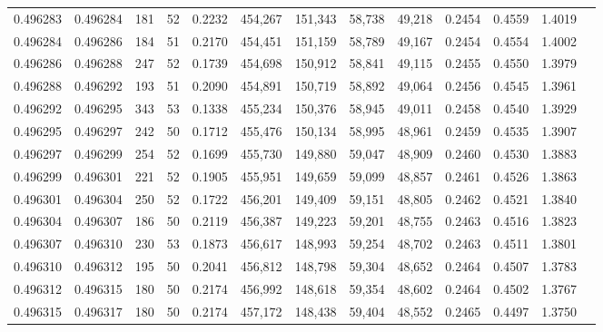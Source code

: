 \begin{tabular}{rrrrrrrrrrrrr}
0.496283 & 0.496284 &   181 &  52 &                                     0.2232 & 454,267 & 151,343 &  58,738 &  49,218 & 0.2454 & 0.4559 & 1.4019 \\
0.496284 & 0.496286 &   184 &  51 &                                     0.2170 & 454,451 & 151,159 &  58,789 &  49,167 & 0.2454 & 0.4554 & 1.4002 \\
0.496286 & 0.496288 &   247 &  52 &                                     0.1739 & 454,698 & 150,912 &  58,841 &  49,115 & 0.2455 & 0.4550 & 1.3979 \\
0.496288 & 0.496292 &   193 &  51 &                                     0.2090 & 454,891 & 150,719 &  58,892 &  49,064 & 0.2456 & 0.4545 & 1.3961 \\
0.496292 & 0.496295 &   343 &  53 &                                     0.1338 & 455,234 & 150,376 &  58,945 &  49,011 & 0.2458 & 0.4540 & 1.3929 \\
0.496295 & 0.496297 &   242 &  50 &                                     0.1712 & 455,476 & 150,134 &  58,995 &  48,961 & 0.2459 & 0.4535 & 1.3907 \\
0.496297 & 0.496299 &   254 &  52 &                                     0.1699 & 455,730 & 149,880 &  59,047 &  48,909 & 0.2460 & 0.4530 & 1.3883 \\
0.496299 & 0.496301 &   221 &  52 &                                     0.1905 & 455,951 & 149,659 &  59,099 &  48,857 & 0.2461 & 0.4526 & 1.3863 \\
0.496301 & 0.496304 &   250 &  52 &                                     0.1722 & 456,201 & 149,409 &  59,151 &  48,805 & 0.2462 & 0.4521 & 1.3840 \\
0.496304 & 0.496307 &   186 &  50 &                                     0.2119 & 456,387 & 149,223 &  59,201 &  48,755 & 0.2463 & 0.4516 & 1.3823 \\
0.496307 & 0.496310 &   230 &  53 &                                     0.1873 & 456,617 & 148,993 &  59,254 &  48,702 & 0.2463 & 0.4511 & 1.3801 \\
0.496310 & 0.496312 &   195 &  50 &                                     0.2041 & 456,812 & 148,798 &  59,304 &  48,652 & 0.2464 & 0.4507 & 1.3783 \\
0.496312 & 0.496315 &   180 &  50 &                                     0.2174 & 456,992 & 148,618 &  59,354 &  48,602 & 0.2464 & 0.4502 & 1.3767 \\
0.496315 & 0.496317 &   180 &  50 &                                     0.2174 & 457,172 & 148,438 &  59,404 &  48,552 & 0.2465 & 0.4497 & 1.3750 \\

\end{tabular}

